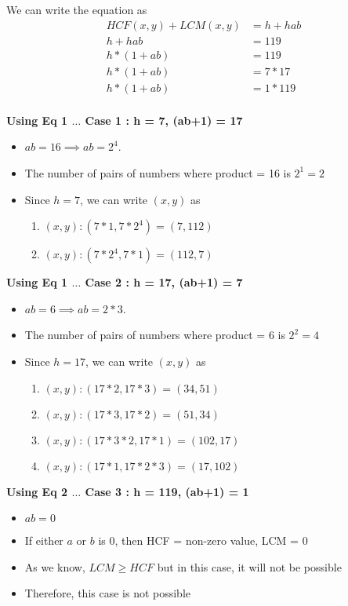We can write the equation as 
\begin{align*}
    HCF(x,y) + LCM(x,y) &= h + hab \\
    h + hab &= 119 \\
    h * (1 + ab) &= 119 \\
    h * (1 + ab) &= 7 * 17 \tag{Eq 1} \\
    h * (1 + ab) &= 1 * 119 \tag{Eq 2} \\
\end{align*}

\textbf{Using Eq 1 $\ldots$ Case 1 : h = 7, (ab+1) = 17}
\begin{itemize}
    \item $ab = 16 \implies ab = 2^4$.
    \item The number of pairs of numbers where product = 16 is $2^1 = 2$
    \item Since $h = 7$, we can write $(x,y)$ as
    \begin{enumerate}
        \item $(x,y) : (7 * 1, 7 * 2^4) = (7,112)$
        \item $(x,y) : (7 * 2^4, 7 * 1) = (112,7)$
    \end{enumerate}
\end{itemize}

\textbf{Using Eq 1 $\ldots$ Case 2 : h = 17, (ab+1) = 7}
\begin{itemize}
    \item $ab = 6 \implies ab = 2 * 3$.
    \item The number of pairs of numbers where product = 6 is $2^2 = 4$
    \item Since $h = 17$, we can write $(x,y)$ as
    \begin{enumerate}
        \item $(x,y) : (17 * 2, 17 * 3) = (34,51)$
        \item $(x,y) : (17 * 3, 17 * 2) = (51,34)$
        \item $(x,y) : (17 * 3 * 2, 17 * 1) = (102,17)$
        \item $(x,y) : (17 * 1, 17 * 2 * 3) = (17,102)$
    \end{enumerate}
\end{itemize}

\textbf{Using Eq 2 $\ldots$ Case 3 : h = 119, (ab+1) = 1}
\begin{itemize}
    \item $ab = 0$
    \item If either $a$ or $b$ is 0, then HCF = non-zero value, LCM = 0
    \item As we know, $LCM \geq HCF$ but in this case, it will not be possible
    \item Therefore, this case is not possible
\end{itemize}


